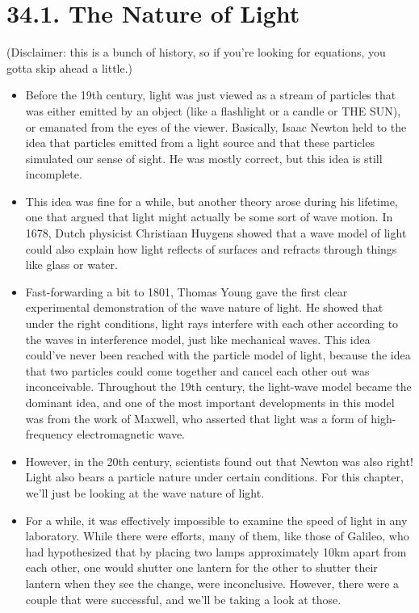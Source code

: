 \documentclass[12pt, letterpaper]{article}
\begin{document}
\section*{34.1. The Nature of Light}
(Disclaimer: this is a bunch of history, so if you're looking for equations, you gotta skip ahead a little.) 
\begin{itemize}
    \item Before the 19th century, light was just viewed as a stream of particles that was either emitted by an object (like a flashlight or a candle or THE SUN), or emanated from the eyes of the viewer. Basically, Isaac Newton held to the idea that particles emitted from a light source and that these particles simulated our sense of sight. He was mostly correct, but this idea is still incomplete.
    \item This idea was fine for a while, but another theory arose during his lifetime, one that argued that light might actually be some sort of wave motion. In 1678, Dutch physicist Christiaan Huygens showed that a wave model of light could also explain how light reflects of surfaces and refracts through things like glass or water.
    \item Fast-forwarding a bit to 1801, Thomas Young gave the first clear experimental demonstration of the wave nature of light. He showed that under the right conditions, light rays interfere with each other according to the waves in interference model, just like mechanical waves. This idea could've never been reached with the particle model of light, because the idea that two particles could come together and cancel each other out was inconceivable. Throughout the 19th century, the light-wave model became the dominant idea, and one of the most important developments in this model was from the work of Maxwell, who asserted that light was a form of high-frequency electromagnetic wave.
    \item However, in the 20th century, scientists found out that Newton was also right! Light also bears a particle nature under certain conditions. For this chapter, we'll just be looking at the wave nature of light. 
    \item For a while, it was effectively impossible to examine the speed of light in any laboratory. While there were efforts, many of them, like those of Galileo, who had hypothesized that by placing two lamps approximately 10km apart from each other, one would shutter one lantern for the other to shutter their lantern when they see the change, were inconclusive. However, there were a couple that were successful, and we'll be taking a look at those.
\end{itemize}
\end{document}
